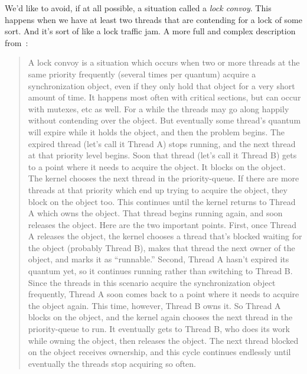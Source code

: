 \documentclass[a4paper]{report}
\begin{document}
We'd like to avoid, if at all possible, a situation called a \textit{lock convoy}. This happens when we have at least two threads that are contending for a lock of some sort. And it's sort of like a lock traffic jam. A more full and complex description from~\cite{lockconvoys}:

\begin{quote}
A lock convoy is a situation which occurs when two or more threads at the same priority frequently (several times per quantum) acquire a synchronization object, even if they only hold that object for a very short amount of time.  It happens most often with critical sections, but can occur with mutexes, etc as well.  For a while the threads may go along happily without contending over the object.  But eventually some thread's quantum will expire while it holds the object, and then the problem begins.  The expired thread (let's call it Thread A) stops running, and the next thread at that priority level begins.  Soon that thread (let's call it Thread B) gets to a point where it needs to acquire the object.  It blocks on the object.  The kernel chooses the next thread in the priority-queue.  If there are more threads at that priority which end up trying to acquire the object, they block on the object too.  This continues until the kernel returns to Thread A which owns the object.  That thread begins running again, and soon releases the object.  Here are the two important points.  First, once Thread A releases the object, the kernel chooses a thread that's blocked waiting for the object (probably Thread B), makes that thread the next owner of the object, and marks it as ``runnable.''  Second, Thread A hasn't expired its quantum yet, so it continues running rather than switching to Thread B.  Since the threads in this scenario acquire the synchronization object frequently, Thread A soon comes back to a point where it needs to acquire the object again.  This time, however, Thread B owns it.  So Thread A blocks on the object, and the kernel again chooses the next thread in the priority-queue to run.  It eventually gets to Thread B, who does its work while owning the object, then releases the object.  The next thread blocked on the object receives ownership, and this cycle continues endlessly until eventually the threads stop acquiring so often.
\end{quote}
\end{document}
